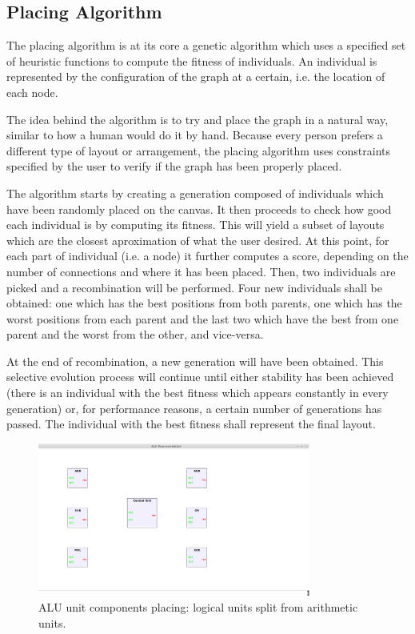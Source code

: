 \label{chap:impl}

\subsection{Placing Algorithm}
 
The placing algorithm is at its core a genetic algorithm \cite{chambers2010practical} which uses
a specified set of heuristic functions to compute the fitness of individuals.
An individual is represented by the configuration of the graph at a certain, i.e.
the location of each node.

The idea behind the algorithm is to try and place the graph in a natural way, similar
to how a human would do it by hand. Because every person prefers a different type of 
layout or arrangement, the placing algorithm uses constraints specified by the user
to verify if the graph has been properly placed.

The algorithm starts by creating a generation composed of individuals which have 
been randomly placed on the canvas. It then proceeds to check how good each 
individual is by computing its fitness. This will yield a subset of layouts which
are the closest aproximation of what the user desired. At this point, for each 
part of individual (i.e. a node) it further computes a score, depending on the
number of connections and where it has been placed. Then, two individuals are 
picked and a recombination will be performed. Four new individuals shall be obtained:
one which has the best positions from both parents, one which has the worst positions
from each parent and the last two which have the best from one parent and the 
worst from the other, and vice-versa.

At the end of recombination, a new generation will have been obtained. This selective 
evolution process \cite{goldberg2006genetic} will continue until either stability has been achieved (there is an
individual with the best fitness which appears constantly in every generation) or, for 
performance reasons, a certain number of generations has passed. The individual with 
the best fitness shall represent the final layout.

\begin{figure}[ht] \centering
\includegraphics[width=0.8\textwidth]{src/placingLogic.png}
\caption{ALU unit components placing: logical units split from arithmetic units.} \end{figure}

